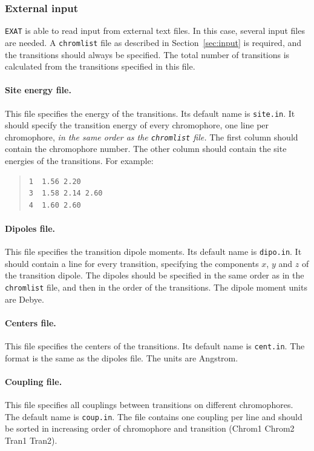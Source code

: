 \documentclass[a4paper,11pt]{article}
\begin{document}
\subsubsection{External input}\label{sec:input_ext}

\texttt{EXAT} is able to read input from external text files. In this case, several input files are needed. A \texttt{chromlist} file as described in Section~\ref{sec:input} is required, and the transitions should always be specified. The total number of transitions is calculated from the transitions specified in this file.

\paragraph*{Site energy file. } 
This file specifies the energy of the transitions. Its default name is \texttt{site.in}. It should specify the transition energy of every chromophore, one line per chromophore, \emph{in the same order as the \texttt{\emph{chromlist}} file.} The first column should contain the chromophore number. The other column should contain the site energies of the transitions. For example:

\begin{quote}
\begin{verbatim}
1  1.56 2.20
3  1.58 2.14 2.60
4  1.60 2.60
\end{verbatim}
\end{quote}

\paragraph*{Dipoles file. } 
This file specifies the transition dipole moments. Its default name is \texttt{dipo.in}. It should contain a line for every transition, specifying the components $x$, $y$ and $z$ of the transition dipole. The dipoles should be specified in the same order as in the \texttt{chromlist} file, and then in the order of the transitions. The dipole moment units are Debye.

\paragraph*{Centers file. } 
This file specifies the centers of the transitions. Its default name is \texttt{cent.in}. The format is the same as the dipoles file. The units are Angstrom.

\paragraph*{Coupling file. } 
This file specifies all couplings between transitions on different chromophores. The default name is \texttt{coup.in}. The file contains one coupling per line and should be sorted in increasing order of chromophore and transition (Chrom1 Chrom2 Tran1 Tran2). 
\end{document}
